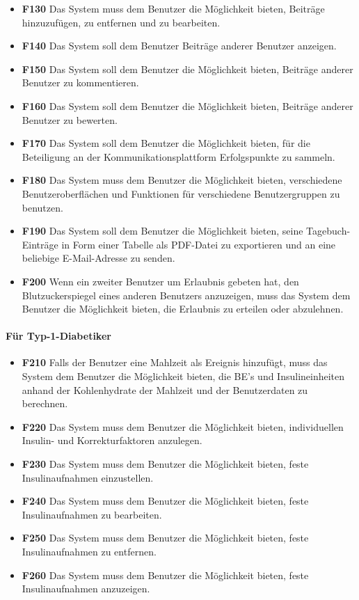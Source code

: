 \begin{itemize}
		\item\textbf{\lbrack F130\rbrack} Das System muss dem Benutzer die Möglichkeit bieten, Beiträge hinzuzufügen, zu entfernen und zu bearbeiten.
		\item\textbf{\lbrack F140\rbrack} Das System soll dem Benutzer Beiträge anderer Benutzer anzeigen.
		\item\textbf{\lbrack F150\rbrack} Das System soll dem Benutzer die Möglichkeit bieten, Beiträge anderer Benutzer zu kommentieren.
		\item\textbf{\lbrack F160\rbrack} Das System soll dem Benutzer die Möglichkeit bieten, Beiträge anderer Benutzer zu bewerten.
		\item\textbf{\lbrack F170\rbrack} Das System soll dem Benutzer die Möglichkeit bieten, für die Beteiligung an der Kommunikationsplattform Erfolgspunkte zu sammeln.
		\item\textbf{\lbrack F180\rbrack} Das System muss dem Benutzer die Möglichkeit bieten, verschiedene Benutzeroberflächen und Funktionen für verschiedene Benutzergruppen zu benutzen.
		\item\textbf{\lbrack F190\rbrack} Das System soll dem Benutzer die Möglichkeit bieten, seine Tagebuch-Einträge in Form einer Tabelle als PDF-Datei zu exportieren und an eine beliebige E-Mail-Adresse zu senden.
		\item\textbf{\lbrack F200\rbrack} Wenn ein zweiter Benutzer um Erlaubnis gebeten hat, den Blutzuckerspiegel eines anderen Benutzers anzuzeigen, muss das System dem Benutzer die Möglichkeit bieten, die Erlaubnis zu erteilen oder abzulehnen.
	\end{itemize}
	\paragraph{Für Typ-1-Diabetiker}\mbox{}
	\begin{itemize}
		\item\textbf{\lbrack F210\rbrack} Falls der Benutzer eine Mahlzeit als Ereignis hinzufügt, muss das System dem Benutzer die Möglichkeit bieten, die BE's und Insulineinheiten anhand der Kohlenhydrate der Mahlzeit und der Benutzerdaten zu berechnen.
		\item\textbf{\lbrack F220\rbrack} Das System muss dem Benutzer die Möglichkeit bieten, individuellen Insulin- und Korrekturfaktoren anzulegen.
		\item\textbf{\lbrack F230\rbrack} Das System muss dem Benutzer die Möglichkeit bieten, feste Insulinaufnahmen einzustellen.
		\item\textbf{\lbrack F240\rbrack} Das System muss dem Benutzer die Möglichkeit bieten, feste Insulinaufnahmen zu bearbeiten.
		\item\textbf{\lbrack F250\rbrack} Das System muss dem Benutzer die Möglichkeit bieten, feste Insulinaufnahmen zu entfernen.
		\item\textbf{\lbrack F260\rbrack} Das System muss dem Benutzer die Möglichkeit bieten, feste Insulinaufnahmen anzuzeigen.
	\end{itemize}
